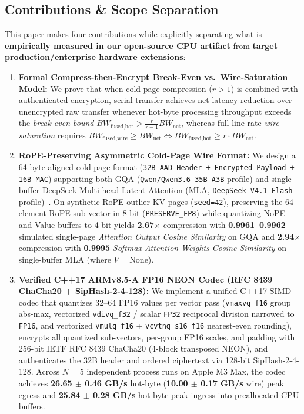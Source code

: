 \documentclass[10pt,twocolumn]{article}
\begin{document}
\subsection{Contributions \& Scope Separation}
This paper makes four contributions while explicitly separating what is \textbf{empirically measured in our open-source CPU artifact} from \textbf{target production/enterprise hardware extensions}:
\begin{enumerate}
    \item \textbf{Formal Compress-then-Encrypt Break-Even vs.\ Wire-Saturation Model:} We prove that when cold-page compression ($r > 1$) is combined with authenticated encryption, serial transfer achieves net latency reduction over unencrypted raw transfer whenever hot-byte processing throughput exceeds the \textit{break-even bound} $BW_{\text{fused,hot}} > \frac{r}{r-1} BW_{\text{net}}$, whereas full line-rate \textit{wire saturation} requires $BW_{\text{fused,wire}} \ge BW_{\text{net}} \iff BW_{\text{fused,hot}} \ge r \cdot BW_{\text{net}}$.
    \item \textbf{RoPE-Preserving Asymmetric Cold-Page Wire Format:} We design a 64-byte-aligned cold-page format (\texttt{32B AAD Header + Encrypted Payload + 16B MAC}) supporting both GQA (\texttt{Qwen/Qwen3.6-35B-A3B} profile) and single-buffer DeepSeek Multi-head Latent Attention (MLA, \texttt{DeepSeek-V4.1-Flash} profile)~\cite{deepseek2024v3}. On synthetic RoPE-outlier KV pages (\texttt{seed=42}), preserving the 64-element RoPE sub-vector in 8-bit (\texttt{PRESERVE\_FP8}) while quantizing NoPE and Value buffers to 4-bit yields \textbf{2.67$\times$} compression with \textbf{0.9961--0.9962} simulated single-page \textit{Attention Output Cosine Similarity} on GQA and \textbf{2.94$\times$} compression with \textbf{0.9995} \textit{Softmax Attention Weights Cosine Similarity} on single-buffer MLA (where $V=\text{None}$).
    \item \textbf{Verified C++17 ARMv8.5-A FP16 NEON Codec (RFC 8439 ChaCha20 + SipHash-2-4-128):} We implement a unified C++17 SIMD codec that quantizes 32--64 FP16 values per vector pass (\texttt{vmaxvq\_f16} group abs-max, vectorized \texttt{vdivq\_f32} / scalar \texttt{FP32} reciprocal division narrowed to \texttt{FP16}, and vectorized \texttt{vmulq\_f16} + \texttt{vcvtnq\_s16\_f16} nearest-even rounding), encrypts all quantized sub-vectors, per-group FP16 scales, and padding with 256-bit IETF RFC 8439 ChaCha20 (4-block transposed NEON), and authenticates the 32B header and ordered ciphertext via 128-bit SipHash-2-4-128. Across $N=5$ independent process runs on Apple M3 Max, the codec achieves \textbf{26.65 $\pm$ 0.46 GB/s} hot-byte (\textbf{10.00 $\pm$ 0.17 GB/s} wire) peak egress and \textbf{25.84 $\pm$ 0.28 GB/s} hot-byte peak ingress into preallocated CPU buffers.

\end{enumerate}
\end{document}
